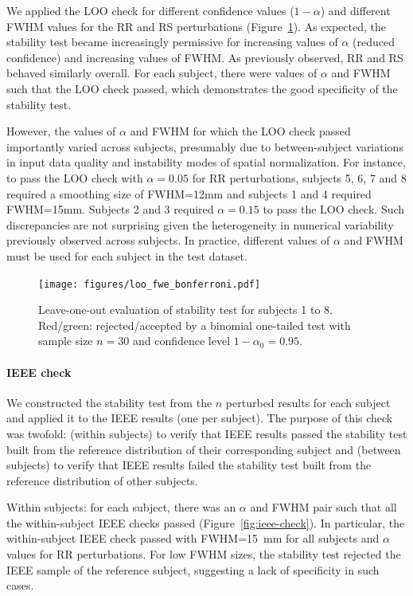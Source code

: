 \documentclass[lettersize,journal]{IEEEtran}
\begin{document}
We applied the LOO check for different confidence values ($1-\alpha$) and different FWHM  values for the RR and RS perturbations (Figure~\ref{fig:loo_bonferroni}). As expected, the stability test became increasingly permissive for increasing values of $\alpha$ (reduced confidence) and increasing values of FWHM. As previously observed, RR and RS behaved similarly overall. For each subject, there were values of $\alpha$ and FWHM such that the LOO check passed, which demonstrates the good specificity of the stability test.

However, the values of $\alpha$ and FWHM for which the LOO check passed importantly varied across subjects, presumably due to between-subject variations in input data quality and instability modes of spatial normalization. For instance, to pass the LOO check with $\alpha=0.05$ for RR perturbations, subjects 5, 6, 7 and 8 required a smoothing size of FWHM=12mm and subjects 1 and 4 required FWHM=15mm. Subjects 2 and 3 required $\alpha=0.15$ to pass the LOO check. Such discrepancies are not surprising given the heterogeneity in numerical variability previously observed across subjects. In practice, different values of $\alpha$ and FWHM must be used for each subject in the test dataset.

\begin{figure}
  \centering
  \texttt{[image: figures/loo\_fwe\_bonferroni.pdf]}
  \caption{Leave-one-out evaluation of stability test for subjects 1 to 8.
    Red/green: rejected/accepted by a binomial one-tailed test with sample size $n=30$ and confidence level $1-\alpha_0=0.95$.}
  \label{fig:loo_bonferroni}
\end{figure}


\paragraph{IEEE check} We constructed the stability test from the $n$ perturbed results for each subject and applied it to the IEEE results (one per subject). The purpose of this check was twofold: (within subjects) to verify that IEEE results passed the stability test built from the reference distribution of their corresponding subject and (between subjects) to verify that IEEE results failed the stability test built from the reference distribution of other subjects.

Within subjects: for each subject, there was an $\alpha$ and FWHM pair such that all the within-subject IEEE checks passed (Figure~\ref{fig:ieee-check}). In particular, the within-subject IEEE check passed with FWHM=15~mm for all subjects and $\alpha$ values for RR perturbations. For low FWHM sizes, the stability test rejected the IEEE sample of the reference subject, suggesting a lack of specificity in such cases.
\end{document}

